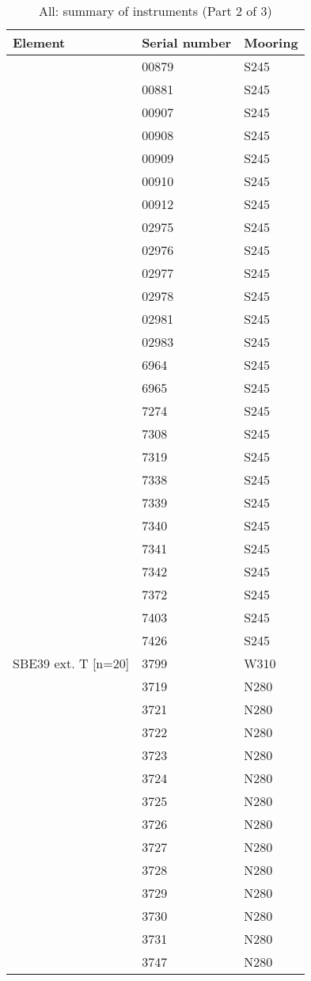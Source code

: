 \documentclass{article}
\begin{document}
\begin{table}[!htbp]
\centering
\caption{All: summary of instruments (Part 2 of 3)}
\begin{tabular}{lll}
\toprule
Element & Serial number & Mooring \\
\midrule
 & 00879 & S245 \\
 & 00881 & S245 \\
 & 00907 & S245 \\
 & 00908 & S245 \\
 & 00909 & S245 \\
 & 00910 & S245 \\
 & 00912 & S245 \\
 & 02975 & S245 \\
 & 02976 & S245 \\
 & 02977 & S245 \\
 & 02978 & S245 \\
 & 02981 & S245 \\
 & 02983 & S245 \\
 & 6964 & S245 \\
 & 6965 & S245 \\
 & 7274 & S245 \\
 & 7308 & S245 \\
 & 7319 & S245 \\
 & 7338 & S245 \\
 & 7339 & S245 \\
 & 7340 & S245 \\
 & 7341 & S245 \\
 & 7342 & S245 \\
 & 7372 & S245 \\
 & 7403 & S245 \\
 & 7426 & S245 \\
SBE39 ext. T [n=20] & 3799 & W310 \\
 & 3719 & N280 \\
 & 3721 & N280 \\
 & 3722 & N280 \\
 & 3723 & N280 \\
 & 3724 & N280 \\
 & 3725 & N280 \\
 & 3726 & N280 \\
 & 3727 & N280 \\
 & 3728 & N280 \\
 & 3729 & N280 \\
 & 3730 & N280 \\
 & 3731 & N280 \\
 & 3747 & N280 \\

\end{tabular}
\end{table}
\end{document}
